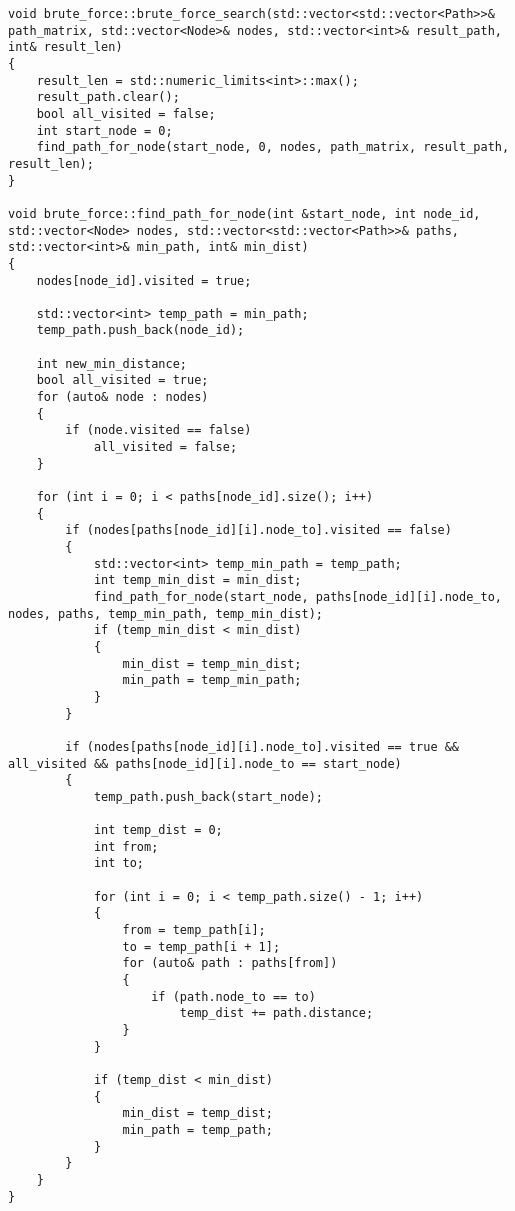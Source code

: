 \begin{lstlisting}[label=some-code-1,caption=Реализация алгоритма полного перебора]
void brute_force::brute_force_search(std::vector<std::vector<Path>>& path_matrix, std::vector<Node>& nodes, std::vector<int>& result_path, int& result_len)
{
	result_len = std::numeric_limits<int>::max();
	result_path.clear();
	bool all_visited = false;
	int start_node = 0;
	find_path_for_node(start_node, 0, nodes, path_matrix, result_path, result_len);
}

void brute_force::find_path_for_node(int &start_node, int node_id, std::vector<Node> nodes, std::vector<std::vector<Path>>& paths, std::vector<int>& min_path, int& min_dist)
{
	nodes[node_id].visited = true;
	
	std::vector<int> temp_path = min_path;
	temp_path.push_back(node_id);

	int new_min_distance;
	bool all_visited = true;
	for (auto& node : nodes)
	{
		if (node.visited == false)
			all_visited = false;
	}

	for (int i = 0; i < paths[node_id].size(); i++)
	{
		if (nodes[paths[node_id][i].node_to].visited == false)
		{
			std::vector<int> temp_min_path = temp_path;
			int temp_min_dist = min_dist;
			find_path_for_node(start_node, paths[node_id][i].node_to, nodes, paths, temp_min_path, temp_min_dist);
			if (temp_min_dist < min_dist)
			{
				min_dist = temp_min_dist;
				min_path = temp_min_path;
			}
		}

		if (nodes[paths[node_id][i].node_to].visited == true && all_visited && paths[node_id][i].node_to == start_node)
		{
			temp_path.push_back(start_node);

			int temp_dist = 0;
			int from;
			int to;

			for (int i = 0; i < temp_path.size() - 1; i++)
			{
				from = temp_path[i];
				to = temp_path[i + 1];
				for (auto& path : paths[from])
				{
					if (path.node_to == to)
						temp_dist += path.distance;
				}
			}

			if (temp_dist < min_dist)
			{
				min_dist = temp_dist;
				min_path = temp_path;
			}
		}
	}
}
\end{lstlisting}

